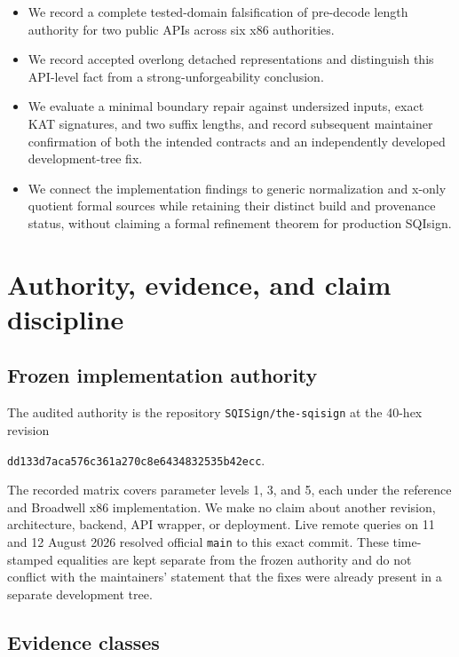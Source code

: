 \documentclass[11pt]{article}
\newcommand{\code}[1]{\texttt{#1}}
\begin{document}
\begin{itemize}
  \item We record a complete tested-domain falsification of pre-decode length
        authority for two public APIs across six x86 authorities.
  \item We record accepted overlong detached representations and distinguish
        this API-level fact from a strong-unforgeability conclusion.
  \item We evaluate a minimal boundary repair against undersized inputs,
        exact KAT signatures, and two suffix lengths, and record subsequent
        maintainer confirmation of both the intended contracts and an
        independently developed development-tree fix.
  \item We connect the implementation findings to generic normalization and
        x-only quotient formal sources while retaining their distinct build
        and provenance status, without claiming a formal refinement theorem
        for production SQIsign.
\end{itemize}

\section{Authority, evidence, and claim discipline}

\subsection{Frozen implementation authority}

The audited authority is the repository \code{SQISign/the-sqisign} at the
40-hex revision
\begin{center}
\code{dd133d7aca576c361a270c8e6434832535b42ecc}.
\end{center}
The recorded matrix covers parameter levels 1, 3, and 5, each under the
reference and Broadwell x86 implementation.  We make no claim about another
revision, architecture, backend, API wrapper, or deployment.  Live remote
queries on 11 and 12 August 2026 resolved official \code{main} to this exact
commit.  These time-stamped equalities are kept separate from the frozen
authority and do not conflict with the maintainers' statement that the fixes
were already present in a separate development tree.

\subsection{Evidence classes}
\end{document}
